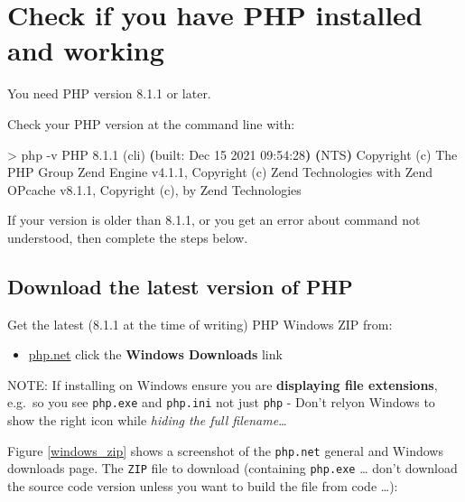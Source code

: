 \documentclass[a4paperpaper,openright]{book}
\newenvironment{Shaded}{}{}
\newcommand{\ExtensionTok}[1]{#1}
\newcommand{\KeywordTok}[1]{\textcolor[rgb]{0.00,0.44,0.13}{\textbf{#1}}}
\newcommand{\NormalTok}[1]{#1}
\newcommand{\OperatorTok}[1]{\textcolor[rgb]{0.40,0.40,0.40}{#1}}
\providecommand{\tightlist}{%
  \setlength{\itemsep}{0pt}\setlength{\parskip}{0pt}}
\begin{document}
\hypertarget{check-if-you-have-php-installed-and-working}{%
\section{Check if you have PHP installed and
working}\label{check-if-you-have-php-installed-and-working}}

You need PHP version 8.1.1 or later.

Check your PHP version at the command line with:

\begin{Shaded}
\begin{Highlighting}[]
   \OperatorTok{>} \ExtensionTok{php}\NormalTok{ -v}
   \ExtensionTok{PHP}\NormalTok{ 8.1.1 (cli) }\KeywordTok{(}\ExtensionTok{built}\NormalTok{: Dec 15 2021 09:54:28}\KeywordTok{)} \KeywordTok{(}\ExtensionTok{NTS}\KeywordTok{)}
   \ExtensionTok{Copyright}\NormalTok{ (c) }\ExtensionTok{The}\NormalTok{ PHP Group}
   \ExtensionTok{Zend}\NormalTok{ Engine v4.1.1, Copyright (c) }\ExtensionTok{Zend}\NormalTok{ Technologies}
       \ExtensionTok{with}\NormalTok{ Zend OPcache v8.1.1, Copyright (c), }\ExtensionTok{by}\NormalTok{ Zend Technologies}
\end{Highlighting}
\end{Shaded}

If your version is older than 8.1.1, or you get an error about command
not understood, then complete the steps below.

\hypertarget{download-the-latest-version-of-php}{%
\subsection{Download the latest version of
PHP}\label{download-the-latest-version-of-php}}

Get the latest (8.1.1 at the time of writing) PHP Windows ZIP from:

\begin{itemize}
\tightlist
\item
  \href{http://php.net/downloads.php}{php.net} click the \textbf{Windows
  Downloads} link
\end{itemize}

NOTE: If installing on Windows ensure you are \textbf{displaying file
extensions}, e.g.~so you see \texttt{php.exe} and \texttt{php.ini} not
just \texttt{php} - Don't relyon Windows to show the right icon while
\emph{hiding the full filename}\ldots{}

Figure \ref{windows_zip} shows a screenshot of the \texttt{php.net}
general and Windows downloads page. The \texttt{ZIP} file to download
(containing \texttt{php.exe} \ldots{} don't download the source code
version unless you want to build the file from code \ldots{}):
\end{document}
